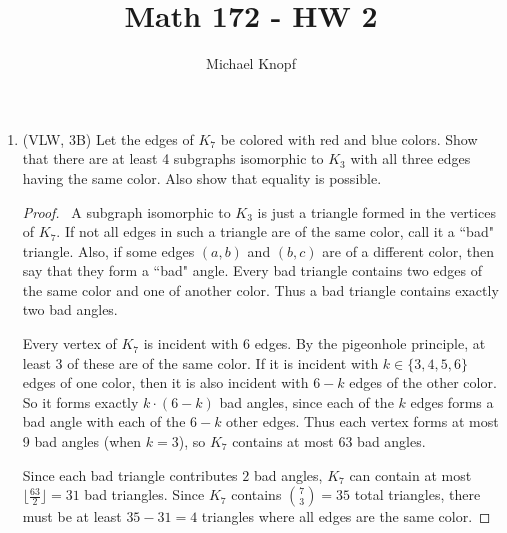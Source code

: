 \documentclass[12pt]{article}
\begin{document}
 


\title{Math 172 - HW 2}
\author{Michael Knopf}
 
\maketitle


\begin{enumerate}[leftmargin=0cm,itemindent=.5cm,labelwidth=\itemindent,labelsep=0cm,align=left]

\item (VLW, 3B) Let the edges of $K_7$ be colored with red and blue colors.  Show that there are at least 4 subgraphs isomorphic to $K_3$ with all three edges having the same color.  Also show that equality is possible.

\begin{proof}

\ A subgraph isomorphic to $K_3$ is just a triangle formed in the vertices of $K_7$.  If not all edges in such a triangle are of the same color, call it a ``bad" triangle.  Also, if some edges $(a,b)$ and $(b,c)$ are of a different color, then say that they form a ``bad" angle.  Every bad triangle contains two edges of the same color and one of another color.  Thus a bad triangle contains exactly two bad angles.

Every vertex of $K_7$ is incident with $6$ edges.  By the pigeonhole principle, at least 3 of these are of the same color.  If it is incident with $k \in \{3,4,5,6\}$ edges of one color, then it is also incident with $6-k$ edges of the other color.  So it forms exactly $k \cdot (6-k)$ bad angles, since each of the $k$ edges forms a bad angle with each of the $6-k$ other edges.  Thus each vertex forms at most 9 bad angles (when $k = 3$), so $K_7$ contains at most 63 bad angles.

Since each bad triangle contributes $2$ bad angles, $K_7$ can contain at most $\lfloor \frac{63}{2} \rfloor = 31$ bad triangles.  Since $K_7$ contains $\binom{7}{3} = 35$ total triangles, there must be at least $35 - 31 = 4$ triangles where all edges are the same color.


\end{proof}
\end{enumerate}
\end{document}
